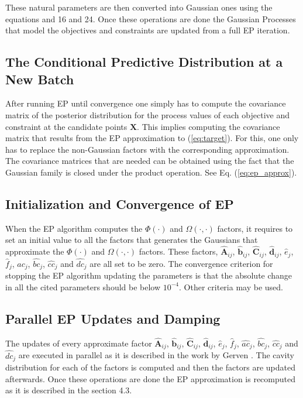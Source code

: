 These natural parameters are then converted into Gaussian ones using the equations and 16 and 24. Once these operations are done the Gaussian Processes that model the objectives and constraints are updated from a full EP iteration.

\subsection{The Conditional Predictive Distribution at a New Batch}

After running EP until convergence one simply has to compute the covariance matrix of the posterior distribution for the process values of each objective and constraint at the candidate points $\mathbf{X}$. This implies computing the covariance matrix that results from the EP approximation to (\ref{eq:target}).  For this, one only has to replace the non-Gaussian factors with the corresponding approximation. The covariance matrices that are needed can be obtained using the fact that the Gaussian family is closed under the product operation. See Eq. (\ref{eq:ep_approx}).

\subsection{Initialization and Convergence of EP}

When the EP algorithm computes the $\Phi(\cdot)$ and $\Omega(\cdot,\cdot)$ factors, it requires to set an initial value to all the factors that generates the Gaussians that approximate the $\Phi(\cdot)$ and $\Omega(\cdot,\cdot)$ factors. These factors, $\hat{\boldsymbol{A}}_{ij}$, $\hat{\boldsymbol{b}}_{ij}$, $\hat{\boldsymbol{C}}_{ij}$, $\hat{\boldsymbol{d}}_{ij}$, $\hat{e}_{j}$, $\hat{f}_{j}$, $\hat{ac}_j$, $\hat{bc}_j$, $\hat{cc}_j$ and $\hat{dc}_j$ are all set to be zero. The convergence criterion for stopping the EP algorithm updating the parameters is that the absolute change in all the cited parameters should be below $10^{-4}$. Other criteria may be used.

\subsection{Parallel EP Updates and Damping}

The updates of every approximate factor $\hat{\boldsymbol{A}}_{ij}$, $\hat{\boldsymbol{b}}_{ij}$, $\hat{\boldsymbol{C}}_{ij}$, $\hat{\boldsymbol{d}}_{ij}$, $\hat{e}_{j}$, $\hat{f}_{j}$, $\hat{ac}_j$, $\hat{bc}_j$, $\hat{cc}_j$ and $\hat{dc}_j$ are executed in parallel as it is described in the work by Gerven \cite{gerven2009bayesian}. The cavity distribution for each of the factors is computed and then the factors are updated afterwards. Once these operations are done the EP approximation is recomputed as it is described in the section 4.3.

